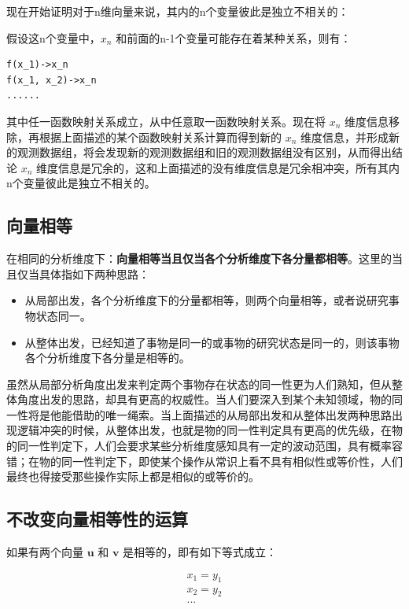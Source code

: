 \documentclass[12pt,oneside]{book}
\begin{document}
现在开始证明对于n维向量来说，其内的n个变量彼此是独立不相关的：

假设这n个变量中，$x_n$ 和前面的n-1个变量可能存在着某种关系，则有：

\begin{Verbatim}
f(x_1)->x_n
f(x_1, x_2)->x_n
......
\end{Verbatim}

其中任一函数映射关系成立，从中任意取一函数映射关系。现在将 $x_n$ 维度信息移除，再根据上面描述的某个函数映射关系计算而得到新的 $x_n$ 维度信息，并形成新的观测数据组，将会发现新的观测数据组和旧的观测数据组没有区别，从而得出结论 $x_n$ 维度信息是冗余的，这和上面描述的没有维度信息是冗余相冲突，所有其内n个变量彼此是独立不相关的。

\subsection{向量相等}
在相同的分析维度下：\textbf{向量相等当且仅当各个分析维度下各分量都相等}。这里的当且仅当具体指如下两种思路：

\begin{itemize}
\item 从局部出发，各个分析维度下的分量都相等，则两个向量相等，或者说研究事物状态同一。
\item 从整体出发，已经知道了事物是同一的或事物的研究状态是同一的，则该事物各个分析维度下各分量是相等的。
\end{itemize}

虽然从局部分析角度出发来判定两个事物存在状态的同一性更为人们熟知，但从整体角度出发的思路，却具有更高的权威性。当人们要深入到某个未知领域，物的同一性将是他能借助的唯一绳索。当上面描述的从局部出发和从整体出发两种思路出现逻辑冲突的时候，从整体出发，也就是物的同一性判定具有更高的优先级，在物的同一性判定下，人们会要求某些分析维度感知具有一定的波动范围，具有概率容错；在物的同一性判定下，即使某个操作从常识上看不具有相似性或等价性，人们最终也得接受那些操作实际上都是相似的或等价的。

\subsection{不改变向量相等性的运算}
如果有两个向量 $\boldsymbol{u}$ 和 $\boldsymbol{v}$ 是相等的，即有如下等式成立：

\begin{align*}
x_1 = y_1\\
x_2 = y_2\\
...
\end{align*}
\end{document}

